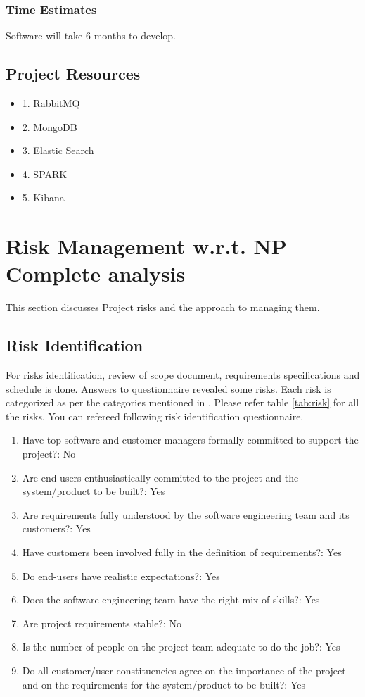 \documentclass[oneside,a4paper,12pt]{book}
\begin{document}
\begin{enumerate}
\subsubsection{Time Estimates}

Software will take 6 months to develop. 

\subsection{Project Resources}
          \begin{itemize}
\item 1.	RabbitMQ 
\item 2.	MongoDB
\item 3.	Elastic Search 
\item 4.	SPARK
\item 5.	Kibana 
\end{itemize}


 

\section{Risk Management w.r.t. NP Complete analysis}
This section discusses Project risks and the approach to managing them.
\subsection{Risk Identification}
For risks identification, review of scope document, requirements specifications and schedule is done. Answers to questionnaire revealed some risks. Each risk is categorized as per the categories mentioned in \cite{bookPressman}. Please refer table \ref{tab:risk} for all the risks. You can refereed following risk identification questionnaire.

\begin{enumerate}
\item Have top software and customer managers formally committed to support the project?: No
\item Are end-users enthusiastically committed to the project and the system/product to be built?: Yes
\item Are requirements fully understood by the software engineering team and its customers?: Yes
\item Have customers been involved fully in the definition of requirements?: Yes
\item Do end-users have realistic expectations?: Yes
\item Does the software engineering team have the right mix of skills?: Yes
\item Are project requirements stable?: No
\item Is the number of people on the project team adequate to do the job?: Yes
\item Do all customer/user constituencies agree on the importance of the project and on the requirements for the system/product to be built?: Yes
\end{enumerate}


\end{enumerate}
\end{document}
